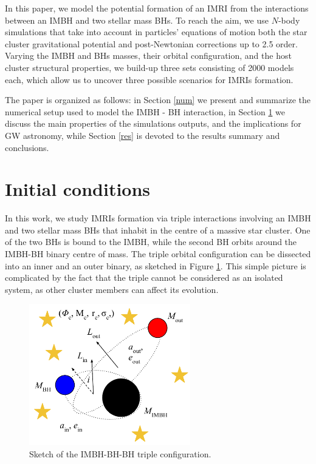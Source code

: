 \documentclass[twocolumn]{aastex62}
\begin{document}
In this paper, we model the potential formation of an IMRI from the interactions between an IMBH and two stellar mass BHs. To reach the aim, we use $N$-body simulations that take into account in particles' equations of motion both the star cluster gravitational potential and post-Newtonian corrections up to 2.5 order. Varying the IMBH and BHs masses, their orbital configuration, and the host cluster structural properties, we build-up three sets consisting of 2000 models each, which allow us to uncover three possible scenarios for IMRIs formation. 

The paper is organized as follows: in Section \ref{num} we present and summarize the numerical setup used to model the IMBH - BH interaction, in Section \ref{met} we discuss the main properties of the simulations outputs, and the implications for GW astronomy, while Section \ref{res} is devoted to the results summary and conclusions. 


\section{Initial conditions}
\label{met}

In this work, we study IMRIs formation via triple interactions involving an IMBH and two stellar mass BHs that inhabit in the centre of a massive star cluster. 
One of the two BHs is bound to the IMBH, while the second BH orbits around the IMBH-BH binary centre of mass. The triple orbital configuration can be dissected into an inner and an outer binary, as sketched in Figure \ref{fig:f1}. This simple picture is complicated by the fact that the triple cannot be considered as an isolated system, as other cluster members can affect its evolution.

\begin{figure}
    \centering
    \includegraphics[width=7cm]{triple}
    \caption{Sketch of the IMBH-BH-BH triple configuration.}
    \label{fig:f1}
\end{figure}
\end{document}
